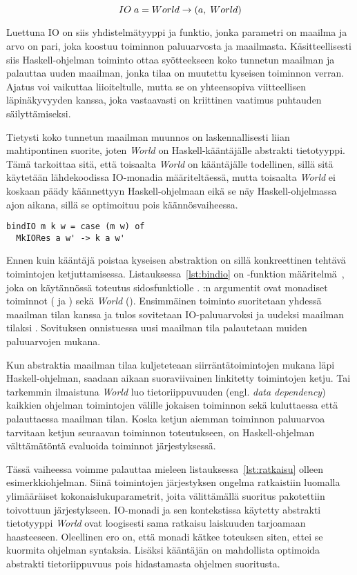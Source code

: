 \documentclass[finnish]{tktltiki2}
\begin{document}
$$ IO\; a = World \rightarrow (a,\; World) $$

Luettuna IO on siis yhdistelmätyyppi ja funktio, jonka parametri on maailma ja arvo on pari, joka
koostuu toiminnon paluuarvosta ja maailmasta. Käsitteellisesti siis Haskell-ohjelman toiminto ottaa
syötteekseen koko tunnetun maailman ja palauttaa uuden maailman, jonka tilaa on muutettu kyseisen
toiminnon verran. Ajatus voi vaikuttaa liioiteltulle, mutta se on yhteensopiva viitteellisen
läpinäkyvyyden kanssa, joka vastaavasti on kriittinen vaatimus puhtauden säilyttämiseksi.

Tietysti koko tunnetun maailman muunnos on laskennallisesti liian mahtipontinen suorite, joten
\emph{World} on Haskell-kääntäjälle abstrakti tietotyyppi. Tämä tarkoittaa sitä, että toisaalta
\emph{World} on kääntäjälle todellinen, sillä sitä käytetään lähdekoodissa IO-monadia
määriteltäessä, mutta toisaalta \emph{World} ei koskaan päädy käännettyyn Haskell-ohjelmaan eikä se
näy Haskell-ohjelmassa ajon aikana, sillä se optimoituu pois käännösvaiheessa.

\begin{lstlisting}[float,label={lst:bindio},caption={IFP, bindIO:n määritelmä}]
bindIO m k w = case (m w) of
  MkIORes a w' -> k a w'
\end{lstlisting}

Ennen kuin kääntäjä poistaa kyseisen abstraktion on sillä konkreettinen tehtävä toimintojen
ketjuttamisessa. Listauksessa~\ref{lst:bindio} on -funktion määritelmä~\cite{ifp93},
joka on käytännössä toteutus sidosfunktiolle \code{(>>=)}. :n argumentit ovat monadiset
toiminnot ( ja ) sekä \emph{World} (). Ensimmäinen toiminto suoritetaan
yhdessä maailman tilan kanssa ja tulos sovitetaan IO-paluuarvoksi  ja uudeksi maailman
tilaksi . Sovituksen onnistuessa uusi maailman tila palautetaan muiden paluuarvojen mukana.

Kun abstraktia maailman tilaa kuljeteteaan siirräntätoimintojen mukana läpi Haskell-ohjelman,
saadaan aikaan suoraviivainen linkitetty toimintojen ketju. Tai tarkemmin ilmaistuna \emph{World}
luo tietoriippuvuuden (engl. \emph{data dependency}) kaikkien ohjelman toimintojen välille jokaisen
toiminnon sekä kuluttaessa että palauttaessa maailman tilan. Koska ketjun aiemman toiminnon
paluuarvoa tarvitaan ketjun seuraavan toiminnon toteutukseen, on Haskell-ohjelman välttämätöntä
evaluoida toiminnot järjestyksessä.

Tässä vaiheessa voimme palauttaa mieleen listauksessa~\ref{lst:ratkaisu} olleen esimerkkiohjelman.
Siinä toimintojen järjestyksen ongelma ratkaistiin luomalla ylimääräiset kokonaislukuparametrit,
joita välittämällä suoritus pakotettiin toivottuun järjestykseen. IO-monadi ja sen kontekstissa
käytetty abstrakti tietotyyppi \emph{World} ovat loogisesti sama ratkaisu laiskuuden tarjoamaan
haasteeseen. Oleellinen ero on, että monadi kätkee toteuksen siten, ettei se kuormita ohjelman
syntaksia. Lisäksi kääntäjän on mahdollista optimoida abstrakti tietoriippuvuus pois hidastamasta
ohjelmen suoritusta.
\end{document}
